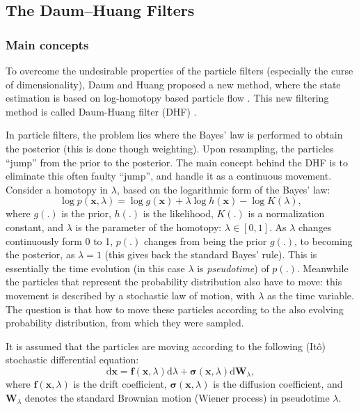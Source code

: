 \subsection{The Daum--Huang Filters}
\subsubsection{Main concepts}
To overcome the  undesirable properties of the particle filters (especially the curse of dimensionality), Daum and Huang proposed a new method, where the state estimation is based on log-homotopy based particle flow \cite{Daum2007}. This new filtering method is called Daum-Huang filter (DHF) \cite{Choi2011}.

In particle filters, the problem lies where the Bayes' law is performed to obtain the posterior (this is done though weighting). Upon resampling, the particles ``jump'' from the prior to the posterior. The main concept behind the DHF is to eliminate this often faulty ``jump'', and handle it as a continuous movement. Consider a homotopy in $\lambda$, based on the logarithmic form of the Bayes' law:
\begin{equation}\label{eq:bayes-loghom}
    \log p(\mathbf{x},\lambda) = \log g(\mathbf{x}) + \lambda \log h(\mathbf{x}) - \log K(\lambda),
\end{equation}
where $g(.)$ is the prior, $h(.)$ is the likelihood, $K(.)$ is a normalization constant, and $\lambda$ is the parameter of the homotopy: $\lambda \in [0,1]$. As $\lambda$ changes continuously form 0 to 1, $p(.)$ changes from being the prior $g(.)$, to becoming the posterior, as $\lambda = 1$ (this gives back the standard Bayes' rule). This is essentially the time evolution (in this case $\lambda$ is \emph{pseudotime}) of $p(.)$. Meanwhile the particles that represent the probability distribution also have to move: this movement is described by a stochastic law of motion, with $\lambda$ as the time variable. The question is that how to move these particles according to the also evolving probability distribution, from which they were sampled.

It is assumed that the particles are moving according to the following (It\^{o}) stochastic  differential equation:
\begin{equation}\label{eq:dhf-sde}
    \mathrm{d} \mathbf{x}=\mathbf{f}(\mathbf{x}, \lambda) \mathrm{d} \lambda+\boldsymbol{\sigma}(\mathbf{x}, \lambda) \mathrm{d} \mathbf{W}_{\lambda},
\end{equation}
where $\mathbf{f}(\mathbf{x},\lambda)$ is the drift coefficient,
$\boldsymbol\sigma(\mathbf{x},\lambda)$ is the diffusion coefficient,
and $\mathbf{W}_\lambda$ denotes the standard Brownian motion (Wiener process) in
pseudotime $\lambda$.

